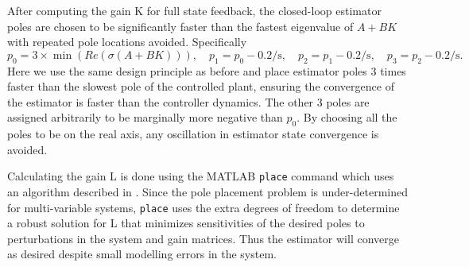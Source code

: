 \documentclass[letterpaper,11pt]{article}
\begin{document}
After computing the gain K for full state feedback, the closed-loop estimator
poles are chosen to be significantly faster than the fastest eigenvalue of
$A+BK$ with repeated pole locations avoided. Specifically
\begin{equation*}
p_0 = 3 \times \min\left(Re\left(\sigma\left(A + BK\right)\right)\right),
\quad
p_1 = p_0 - 0.2 \si{\per\s},
\quad
p_2 = p_1 - 0.2 \si{\per\s},
\quad
p_3 = p_2 - 0.2 \si{\per\s}.
\end{equation*}
Here we use the same design principle as before and place estimator poles 3
times faster than the slowest pole of the controlled plant, ensuring the
convergence of the estimator is faster than the controller dynamics. The other
3 poles are assigned arbitrarily to be marginally more negative than $p_0$.  By
choosing all the poles to be on the real axis, any oscillation in estimator
state convergence is avoided.

Calculating the gain L is done using the MATLAB \verb|place| command which uses
an algorithm described in \cite{Kautsky1985}. Since the pole placement problem
is under-determined for multi-variable systems, \verb|place| uses the extra
degrees of freedom to determine a robust solution for L that minimizes
sensitivities of the desired poles to perturbations in the system and gain
matrices. Thus the estimator will converge as desired despite small modelling
errors in the system.
\end{document}

